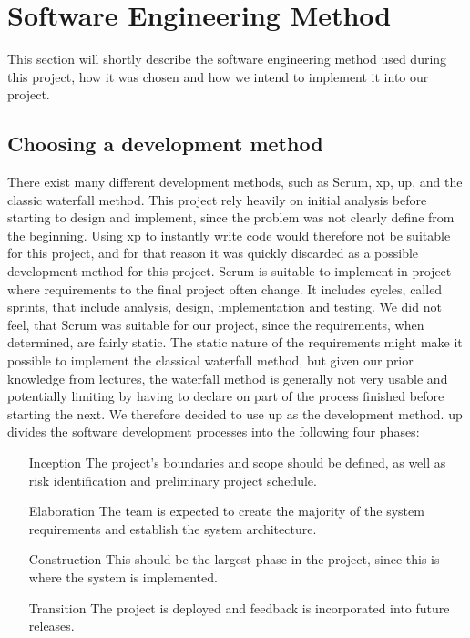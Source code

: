 \section{Software Engineering Method}
This section will shortly describe the software engineering method used during this project, how it was chosen and how we intend to implement it into our project.

\subsection{Choosing a development method}
There exist many different development methods, such as Scrum, \ac{xp}, \ac{up}, and the classic waterfall method. This project rely heavily on initial analysis before starting to design and implement, since the problem was not clearly define from the beginning. Using \ac{xp} to instantly write code would therefore not be suitable for this project, and for that reason it was quickly discarded as a possible development method for this project. Scrum is suitable to implement in project where requirements to the final project often change. It includes cycles, called sprints, that include analysis, design, implementation and testing. We did not feel, that Scrum was suitable for our project, since the requirements, when determined, are fairly static. The static nature of the requirements might make it possible to implement the classical waterfall method, but given our prior knowledge from lectures, the waterfall method is generally not very usable and potentially limiting by having to declare on part of the process finished before starting the next. We therefore decided to use \ac{up} as the development method. \ac{up} divides the software development processes into the following four phases: 

\begin{itemize}
\item[Inception] The project's boundaries and scope should be defined, as well as risk identification and preliminary project schedule.
\item[Elaboration] The team is expected to create the majority of the system requirements and establish the system architecture.
\item[Construction] This should be the largest phase in the project, since this is where the system is implemented.
\item[Transition] The project is deployed and feedback is incorporated into future releases.
\end{itemize}


